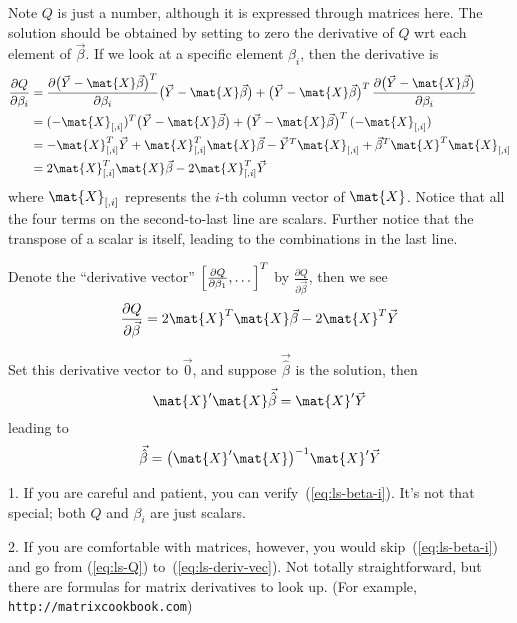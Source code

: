 \documentclass[12pt]{article}
\begin{document}
Note $Q$ is just a number, although it is expressed through matrices
here.
The solution should be obtained by setting to zero
the derivative of $Q$ wrt each element of $\vec\beta$.
If we look at a specific element $\beta_i$, then
the derivative is
\begin{equation}\label{eq:ls-beta-i}
\begin{split}
\frac{\partial Q}{\partial \beta_i}
&= \frac{\partial \bigl(\vec{Y} - \mat{X}\vec\beta\bigr)^T}
    {\partial \beta_i}
    \bigl(\vec{Y} - \mat{X}\vec\beta\bigr)
  +
  \bigl(\vec{Y} - \mat{X}\vec\beta\bigr)^T
  \,
  \frac{\partial \bigl(\vec{Y} - \mat{X}\vec\beta\bigr)}
    {\partial \beta_i}
\\
&= (-\mat{X}_{[,i]})^T
    \bigl(\vec{Y} - \mat{X}\vec\beta\bigr)
  +
  \bigl(\vec{Y} - \mat{X}\vec\beta\bigr)^T
  \,
  (-\mat{X}_{[,i]})
\\
&=  -\mat{X}_{[,i]}^T \vec{Y}
    + \mat{X}_{[,i]}^T\mat{X}\vec{\beta}
    - \vec{Y}^T\mat{X}_{[,i]}
    + \vec\beta^T \mat{X}^T \mat{X}_{[,i]}
\\
&= 2\mat{X}_{[,i]}^T \mat{X} \vec{\beta}
    -2\mat{X}_{[,i]}^T \vec{Y}
\end{split}
\end{equation}
where $\mat{X}_{[,i]}$ represents the $i$-th column vector of $\mat{X}$.
Notice that all the four terms on the second-to-last line are scalars.
Further notice that the transpose of a scalar is itself,
leading to the combinations in the last line.

Denote the ``derivative vector''
$\Bigl[\frac{\partial Q}{\partial \beta_1}, \dotsc\Bigr]^T$ by
$\frac{\partial Q}{\partial \vec\beta}$, then we see
\begin{equation}\label{eq:ls-deriv-vec}
\frac{\partial Q}{\partial \vec\beta}
= 2\mat{X}^T \mat{X} \vec{\beta}
    -2\mat{X}^T \vec{Y}
\end{equation}

Set this derivative vector to $\vec{0}$,
and suppose $\vec{\hat\beta}$ is the solution, then
\begin{equation}\label{eq:ls-normal-matrix}
\mat{X}'\mat{X} \vec{\hat\beta} = \mat{X}'\vec{Y}
\end{equation}
leading to
\[
\vec{\hat\beta} = \bigl(\mat{X}'\mat{X}\bigr)^{-1}\mat{X}'\vec{Y}
\]

\alert[Remarks]%
1. If you are careful and patient, you can verify~(\ref{eq:ls-beta-i}).
It's not that special; both $Q$ and $\beta_i$ are just scalars.

2. If you are comfortable with matrices, however,
you would skip~(\ref{eq:ls-beta-i}) and go from
(\ref{eq:ls-Q}) to~(\ref{eq:ls-deriv-vec}).
Not totally straightforward, but there are formulas
for matrix derivatives to look up.
(For example, \texttt{http://matrixcookbook.com})
\end{document}
